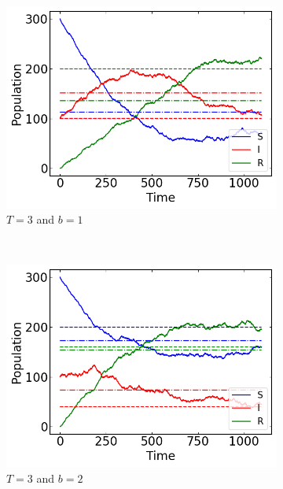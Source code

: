 \begin{figure}[H]
    \centering
    \begin{subfigure}{0.49\textwidth}
        \centering
        \includegraphics[width=\linewidth]{../fig/texfig/MC_b1T3.png}
        \caption{$T = 3$ and $b =1$}
    \end{subfigure}%
     ~ 
    \begin{subfigure}{0.49\textwidth}
         \centering
         \includegraphics[width=\linewidth]{../fig/texfig/MC_b2T3.png}
         \caption{$T = 3$ and $b =2$}
    \end{subfigure}
     ~ 
    \begin{subfigure}{0.49\textwidth}
         \centering

\end{subfigure}
\end{figure}
